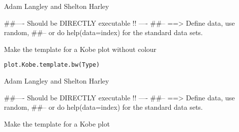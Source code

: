\documentclass[a4paper]{book}
\begin{document}
%
\begin{Author}\relax

Adam Langley and Shelton Harley
\end{Author}
%
\begin{Examples}
\begin{ExampleCode}
##---- Should be DIRECTLY executable !! ----
##-- ==>  Define data, use random,
##--	or do  help(data=index)  for the standard data sets.

\end{ExampleCode}
\end{Examples}
%
\begin{Description}\relax

Make the template for a Kobe plot without colour
\end{Description}
%
\begin{Usage}
\begin{verbatim}
plot.Kobe.template.bw(Type)
\end{verbatim}
\end{Usage}
%
\begin{Arguments}
\begin{ldescription}
\item[\code{Type}] 


\end{ldescription}
\end{Arguments}
%
\begin{Author}\relax

Adam Langley and Shelton Harley
\end{Author}
%
\begin{Examples}
\begin{ExampleCode}
##---- Should be DIRECTLY executable !! ----
##-- ==>  Define data, use random,
##--	or do  help(data=index)  for the standard data sets.

\end{ExampleCode}
\end{Examples}
%
\begin{Description}\relax

Make the template for a Kobe plot
\end{Description}
\end{document}
